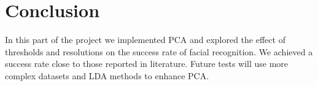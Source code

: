 \documentclass{article} %
\begin{document}
\section{Conclusion}

In this part of the project we implemented PCA and explored the effect of thresholds and resolutions on the success rate of facial recognition.  We achieved a success rate close to those reported in literature.  Future tests will use more complex datasets and LDA methods to enhance PCA.

\newpage
{}

\end{document}
